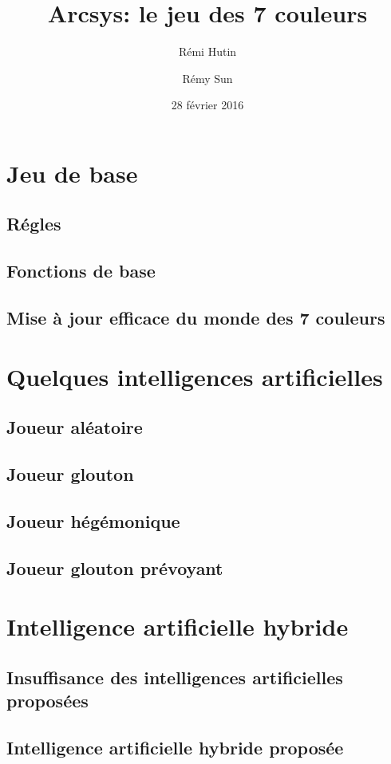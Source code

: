 \message{ !name(Rapport.tex)}\documentclass[a4paper,11pt]{article}
\title{Arcsys: le jeu des 7 couleurs}
\author{Rémi Hutin \and Rémy Sun}
\date{28 février 2016}
\begin{document}


\maketitle

\begin{abstract}
  
\end{abstract}

\section{Jeu de base}

\subsection{Régles}

\subsection{Fonctions de base}

\subsection{Mise à jour efficace du monde des 7 couleurs}

\section{Quelques intelligences artificielles}

\subsection{Joueur aléatoire}

\subsection{Joueur glouton}

\subsection{Joueur hégémonique}

\subsection{Joueur glouton prévoyant}


\section{Intelligence artificielle hybride}

\subsection{Insuffisance des intelligences artificielles proposées}

\subsection{Intelligence artificielle hybride proposée}
\end{document}

